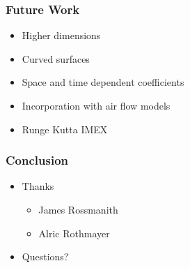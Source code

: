\documentclass[10pt]{beamer}
\begin{document}
    \begin{frame}
      \frametitle{Future Work}
      \begin{itemize}
        \item Higher dimensions
        \item Curved surfaces
        \item Space and time dependent coefficients
        \item Incorporation with air flow models
        \item Runge Kutta IMEX
      \end{itemize}
    \end{frame}

    \begin{frame}
      \frametitle{Conclusion}
      \begin{itemize}
        \item Thanks
          \begin{itemize}
            \item James Rossmanith
            \item Alric Rothmayer
          \end{itemize}
        \item Questions?
      \end{itemize}
    \end{frame}

\end{document}
